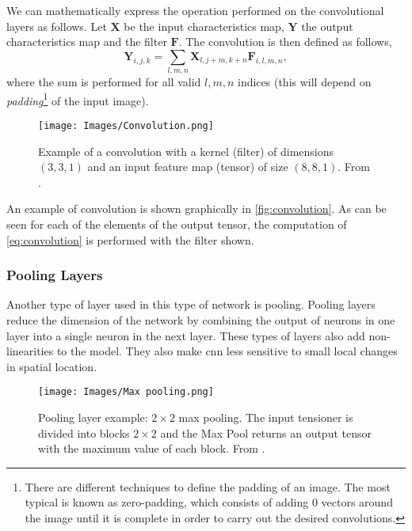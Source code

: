 We can mathematically express the operation performed on the convolutional
layers as follows. Let \(\mathbf{X}\) be the input characteristics map,
\(\mathbf{Y}\) the output characteristics map and the filter
\(\mathbf{F}\). The convolution is then defined as follows,
\begin{equation} \label{eq:convolution}
  \mathbf{Y}_{i, j, k} =
  \sum_{l, m, n} \mathbf{X}_{l, j + m, k + n}\mathbf{F}_{i, l, m, n},
\end{equation}
where the sum is performed for all valid \(l, m, n\) indices (this will depend
on \emph{padding}\footnote{There are different techniques to define the
  padding of an image. The most typical is known as zero-padding, which
  consists of adding 0 vectors around the image until it is complete in order
  to carry out the desired convolutions.} of the input image).

\begin{figure}[ht]
  \centering
  \texttt{[image: Images/Convolution.png]}
  \caption[Example of convolution operation]{Example of a convolution with a
    kernel (filter) of dimensions \((3, 3, 1)\) and an input feature map
    (tensor) of size \((8, 8, 1)\). From
    .}\label{fig:convolution}
\end{figure}

An example of convolution is shown graphically in \vref{fig:convolution}. As
can be seen for each of the elements of the output tensor, the computation of
\vref{eq:convolution} is performed with the filter shown.

\subsubsection{Pooling Layers}
Another type of layer used in this type of network is pooling. Pooling layers
reduce the dimension of the network by combining the output of neurons in one
layer into a single neuron in the next layer. These types of layers also add
non-linearities to the model. They also make \gls{cnn} less sensitive to small
local changes in spatial location.

\begin{figure}[ht]
  \centering
  \texttt{[image: Images/Max pooling.png]}
  \caption[Pooling layer example: max pooling]{Pooling layer example:
    \(2 \times 2\) max pooling. The input tensioner is divided into blocks
    \(2 \times 2\) and the Max Pool returns an output tensor with the maximum
    value of each block. From .}\label{fig:max-pool}
\end{figure}

